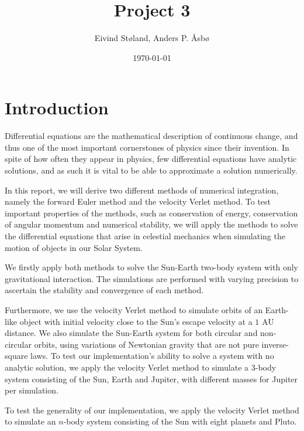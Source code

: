 \documentclass[reprint,english,notitlepage]{revtex4-1}  %
\begin{document}
\title{Project 3}   %
\author{Eivind Støland, Anders P. Åsbø}               %
\date{\today}                             %
\noaffiliation                            %

\maketitle                                %


\tableofcontents

\section{Introduction} \label{sec:I}
Differential equations are the mathematical description of continuous change, and thus one of the most important cornerstones of physics since their invention. In spite of how often they appear in physics, few differential equations have analytic solutions, and as such it is vital to be able to approximate a solution numerically.

In this report, we will derive two different methods of numerical integration, namely the forward Euler method and the velocity Verlet method. To test important properties of the methods, such as conservation of energy, conservation of angular momentum and numerical stability, we will apply the methods to solve the differential equations that arise in celestial mechanics when simulating the motion of objects in our Solar System.

We firstly apply both methods to solve the Sun-Earth two-body system with only gravitational interaction. The simulations are performed with varying precision to ascertain the stability and convergence of each method.

Furthermore, we use the velocity Verlet method to simulate orbits of an Earth-like object with initial velocity close to the Sun’s escape velocity at a \(1\) AU distance. We also simulate the Sun-Earth system for both circular and non-circular orbits, using variations of Newtonian gravity that are not pure inverse-square laws. To test our implementation's ability to solve a system with no analytic solution, we apply the velocity Verlet method to simulate a \(3\)-body system consisting of the Sun, Earth and Jupiter, with different masses for Jupiter per simulation.

To test the generality of our implementation, we apply the velocity Verlet method to simulate an \(n\)-body system consisting of the Sun with eight planets and Pluto.
\end{document}
